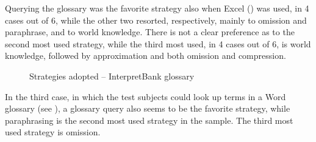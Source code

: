 \documentclass[output=paper]{langsci/langscibook}
\begin{document}
Querying the glossary was the favorite strategy also when Excel () was used, in 4 cases out of 6, while the other two resorted, respectively, mainly to omission and paraphrase, and to world knowledge. There is not a clear preference as to the second most used strategy, while the third most used, in 4 cases out of 6, is world knowledge, followed by approximation and both omission and compression.

\begin{figure}
\caption{Strategies adopted -- InterpretBank glossary} 
\label{fig:prandi:16}
\end{figure}

In the third case, in which the test subjects could look up terms in a Word glossary (see ), a glossary query also seems to be the favorite strategy, while paraphrasing is the second most used strategy in the sample. The third most used strategy is omission.
\end{document}
